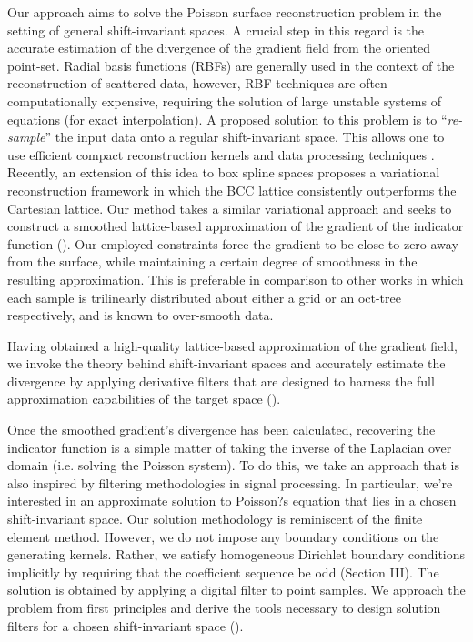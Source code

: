 Our approach aims to solve the Poisson surface reconstruction problem in the setting of general shift-invariant spaces. 
A crucial step in this regard is the accurate estimation of the divergence of the gradient field from the oriented point-set. Radial basis functions (RBFs) are generally used in the context of the reconstruction of scattered data, however, RBF techniques are often computationally expensive, requiring the solution of large unstable systems of equations (for exact interpolation). 
A proposed solution to this problem is to ``\emph{re-sample}'' the input data onto a regular shift-invariant space. 
This allows one to use efficient compact reconstruction kernels and data processing techniques \cite{variational,onvari}. 
Recently, an extension of this idea to box spline spaces \cite{xu2012rec} proposes a variational reconstruction framework in which the BCC lattice consistently outperforms the Cartesian lattice. 
Our method takes a similar variational approach and seeks to construct a smoothed lattice-based approximation of the gradient of the indicator function (). 
Our employed constraints force the gradient to be close to zero away from the surface, while maintaining a certain degree of smoothness in the resulting approximation. 
This is preferable in comparison to other works \cite{fftk,Kazhdan06,screenedk} in which each sample is trilinearly distributed about either a grid or an oct-tree respectively, and is known to over-smooth data. 

Having obtained a high-quality lattice-based approximation of the gradient field, we invoke the theory behind shift-invariant spaces and accurately estimate the divergence by applying derivative filters that are designed to harness the full approximation capabilities of the target space (). 

Once the smoothed gradient's divergence has been calculated, recovering the indicator function is a simple matter of taking the inverse of the Laplacian over domain (i.e. solving the Poisson system). 
To do this, we take an approach that is also inspired by filtering methodologies in signal processing. In particular, we're interested in an approximate solution to Poisson?s equation that lies in a chosen shift-invariant space. 
Our solution methodology is reminiscent of the finite element method. However, we do not impose any boundary conditions on the generating kernels. Rather, we satisfy homogeneous Dirichlet boundary conditions implicitly by requiring that the coefficient sequence be odd (Section III). 
The solution is obtained by applying a digital filter to point samples. We approach the problem from first principles and derive the tools necessary to design solution filters for a chosen shift-invariant space ().

